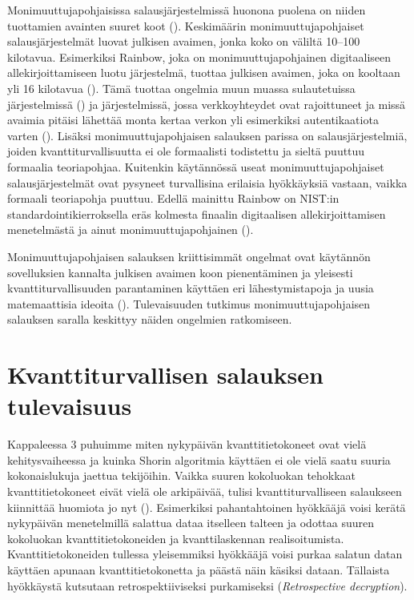 Monimuuttujapohjaisissa salausjärjestelmissä huonona puolena on niiden tuottamien avainten suuret koot (\cite{8012305}). Keskimäärin monimuuttujapohjaiset salausjärjestelmät luovat julkisen avaimen, jonka koko on väliltä 10--100 kilotavua. Esimerkiksi Rainbow, joka on monimuuttujapohjainen digitaaliseen allekirjoittamiseen luotu järjestelmä, tuottaa julkisen avaimen, joka on kooltaan yli 16 kilotavua (\cite{Ding2009}). Tämä tuottaa ongelmia muun muassa sulautetuissa järjestelmissä (\cite{8012305}) ja järjestelmissä, jossa verkkoyhteydet ovat rajoittuneet ja missä avaimia pitäisi lähettää monta kertaa verkon yli esimerkiksi autentikaatiota varten (\cite{Ding2009}). Lisäksi monimuuttujapohjaisen salauksen parissa on salausjärjestelmiä, joiden kvanttiturvallisuutta ei ole formaalisti todistettu ja sieltä puuttuu formaalia teoriapohjaa. Kuitenkin käytännössä useat monimuuttujapohjaiset salausjärjestelmät ovat pysyneet turvallisina erilaisia hyökkäyksiä vastaan, vaikka formaali teoriapohja puuttuu. Edellä mainittu Rainbow on NIST:in standardointikierroksella eräs kolmesta finaalin digitaalisen allekirjoittamisen menetelmästä ja ainut monimuuttujapohjainen (\cite{alagic2020status}).

 Monimuuttujapohjaisen salauksen  kriittisimmät ongelmat ovat käytännön sovelluksien kannalta julkisen avaimen koon pienentäminen ja yleisesti kvanttiturvallisuuden parantaminen käyttäen eri lähestymistapoja ja uusia matemaattisia ideoita (\cite{Ding2009}). Tulevaisuuden tutkimus monimuuttujapohjaisen salauksen saralla keskittyy näiden ongelmien ratkomiseen.

\section{Kvanttiturvallisen salauksen tulevaisuus}
Kappaleessa 3 puhuimme miten nykypäivän kvanttitietokoneet ovat vielä kehitysvaiheessa ja kuinka Shorin algoritmia käyttäen ei ole vielä saatu suuria kokonaislukuja jaettua tekijöihin. Vaikka suuren kokoluokan tehokkaat kvanttitietokoneet eivät vielä ole arkipäivää, tulisi kvanttiturvalliseen salaukseen kiinnittää huomiota jo nyt (\cite{ad93d053a85c4acebdd49cbe1a75d6bd}). Esimerkiksi pahantahtoinen hyökkääjä voisi kerätä nykypäivän menetelmillä salattua dataa itselleen talteen ja odottaa suuren kokoluokan kvanttitietokoneiden ja kvanttilaskennan realisoitumista. Kvanttitietokoneiden tullessa yleisemmiksi hyökkääjä voisi purkaa salatun datan käyttäen apunaan kvanttitietokonetta ja päästä näin käsiksi dataan. Tällaista hyökkäystä kutsutaan retrospektiiviseksi purkamiseksi (\emph{Retrospective decryption}).